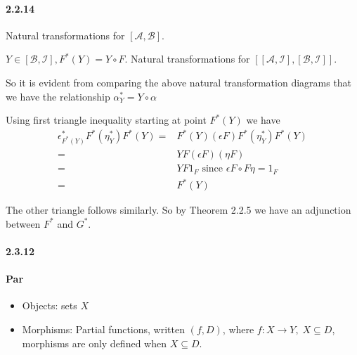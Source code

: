 \documentclass{article}
\begin{document}
\paragraph {2.2.14 }

Natural transformations for $[\mathcal{A}, \mathcal{B}]$.

\begin{center}
\end{center}

$Y \in [\mathcal{B},\mathcal{I}], F^*(Y) = Y \circ F$. Natural transformations for $[[\mathcal{A},\mathcal{I}], [\mathcal{B},\mathcal{I}]]$.

\begin{center}
\end{center}

So it is evident from comparing the above natural transformation diagrams that we have the relationship $\alpha^*_Y = Y \circ \alpha$

Using first triangle inequality starting at point $F^*(Y)$ we have
\begin{align*}
  \epsilon^*_{F^*(Y)}F^*(\eta_Y^*)F^*(Y) = & F^*(Y) (\epsilon F) F^*(\eta_Y^*)F^*(Y) \\
  = & Y F(\epsilon F)(\eta F) \\
  = & YF1_F \text{ since } \epsilon F \circ F \eta = 1_F\\
  = & F^*(Y)
\end{align*}

The other triangle follows similarly. So by Theorem 2.2.5 we have an adjunction between $F^*$ and $G^*$.

\paragraph {2.3.12 }

\paragraph{Par}
\begin{itemize}
  \item Objects: sets $X$
   \item Morphisms: Partial functions, written $(f, D)$, where $f\colon X \rightarrow Y, \; X \subseteq D$, morphisms are only defined when $X \subseteq D$.
\end{itemize}
\end{document}
